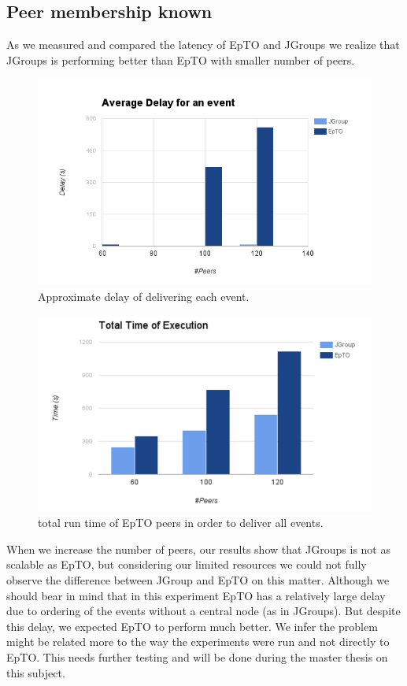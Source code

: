 \documentclass[10pt,conference,a4paper]{IEEEtran}
\begin{document}
\subsection{Peer membership known}
As we measured and compared the latency of EpTO and JGroups we realize that JGroups is performing better than EpTO with smaller number of peers.
\begin{figure}
\includegraphics[width=\linewidth]{figures/Delay.png}
\caption{Approximate delay of delivering each event.}
\label{fig:delay}
\end{figure}
\begin{figure}
\includegraphics[width=\linewidth]{figures/total_time.png}
\caption{total run time of EpTO peers in order to deliver all events.}
\label{fig:total_time}
\end{figure}
When we increase the number of peers, our results show that JGroups is not as scalable as EpTO, but considering our limited resources we could not fully observe the difference between JGroup and EpTO on this matter. Although we should bear in mind that in this experiment EpTO has a relatively large delay due to ordering of the events without a central node (as in JGroups). But despite this delay, we expected EpTO to perform much better. We infer the problem might be related more to the way the experiments were run and not directly to EpTO. This needs further testing and will be done during the master thesis on this subject.
\end{document}
